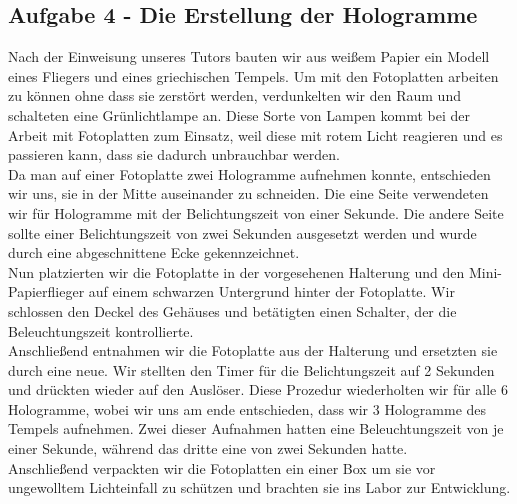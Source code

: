 \subsection*{Aufgabe 4 - Die Erstellung der Hologramme}
Nach der Einweisung unseres Tutors bauten wir aus weißem Papier ein Modell eines Fliegers und eines griechischen Tempels. 
Um mit den Fotoplatten arbeiten zu können ohne dass sie zerstört werden,  verdunkelten wir den Raum und schalteten eine Grünlichtlampe an. Diese Sorte von Lampen kommt bei der Arbeit mit Fotoplatten zum Einsatz, weil diese mit rotem Licht reagieren und es passieren kann, dass sie dadurch unbrauchbar werden.\\
Da man auf einer Fotoplatte zwei Hologramme aufnehmen konnte, entschieden wir uns, sie in der Mitte auseinander zu schneiden. Die eine Seite verwendeten wir für Hologramme mit der Belichtungszeit von einer Sekunde. Die andere Seite sollte einer Belichtungszeit von zwei Sekunden ausgesetzt werden und wurde durch eine abgeschnittene Ecke gekennzeichnet.\\
Nun platzierten wir die Fotoplatte in der vorgesehenen Halterung und den Mini-Papierflieger auf einem schwarzen Untergrund hinter der Fotoplatte. Wir schlossen den Deckel des Gehäuses und betätigten einen Schalter, der die Beleuchtungszeit kontrollierte.\\
Anschließend entnahmen wir die Fotoplatte aus der Halterung und ersetzten sie durch eine neue. Wir stellten den Timer für die Belichtungszeit auf 2 Sekunden und drückten wieder auf den Auslöser. Diese Prozedur wiederholten wir für alle 6 Hologramme, wobei wir uns am ende entschieden, dass wir 3 Hologramme des Tempels aufnehmen. Zwei dieser Aufnahmen hatten eine Beleuchtungszeit von je einer Sekunde, während das dritte eine von zwei Sekunden hatte.\\
Anschließend verpackten wir die Fotoplatten ein einer Box um sie vor ungewolltem Lichteinfall zu schützen und brachten sie ins Labor zur Entwicklung.